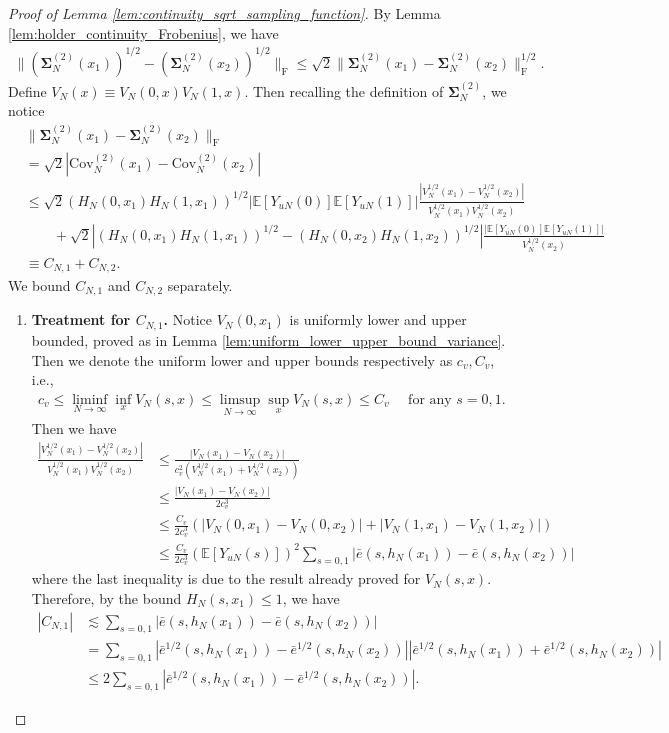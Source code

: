 \documentclass[12pt]{article}
\newcommand{\E}{\mathbb E}								%
\begin{document}
\begin{proof}[Proof of Lemma \ref{lem:continuity_sqrt_sampling_function}]
	By Lemma \ref{lem:holder_continuity_Frobenius}, we have 
	\begin{align*}
		\|(\bm \Sigma_N^{(2)}(x_1))^{1/2}-(\bm \Sigma_N^{(2)}(x_2))^{1/2}\|_{\mathrm{F}}\leq \sqrt{2}\|\bm \Sigma_N^{(2)}(x_1)-\bm \Sigma_N^{(2)}(x_2)\|_{\mathrm{F}}^{1/2}.
	\end{align*}
	Define $V_N(x)\equiv V_N(0,x)V_N(1,x)$. Then recalling the definition of $\bm \Sigma_N^{(2)}$, we notice
	\small 
	\begin{align*}
		&
		\|\bm \Sigma_N^{(2)}(x_1)-\bm \Sigma_N^{(2)}(x_2)\|_{\mathrm{F}}\\
		&
		=\sqrt{2}|\mathrm{Cov}_N^{(2)}(x_1)-\mathrm{Cov}_N^{(2)}(x_2)|\\
		&
		\leq \sqrt{2}(H_N(0,x_1)H_N(1,x_1))^{1/2}|\E[Y_{uN}(0)]\E[Y_{uN}(1)]|\frac{\left|V_N^{1/2}(x_1)-V_N^{1/2}(x_2)\right|}{V_N^{1/2}(x_1)V_N^{1/2}(x_2)}\\
		&
		\qquad + \sqrt{2}\left|(H_N(0,x_1)H_N(1,x_1))^{1/2}-(H_N(0,x_2)H_N(1,x_2))^{1/2}\right|\frac{|\E[Y_{uN}(0)]\E[Y_{uN}(1)]|}{V_N^{1/2}(x_2)}\\
		&
		\equiv C_{N,1}+C_{N,2}.
	\end{align*}
	\normalsize
	We bound $C_{N,1}$ and $C_{N,2}$ separately.
	\begin{enumerate}
		\item \textbf{Treatment for $C_{N,1}$.} Notice $V_N(0,x_1)$ is uniformly lower and upper bounded, proved as in Lemma \ref{lem:uniform_lower_upper_bound_variance}. Then we denote the uniform lower and upper bounds respectively as $c_v,C_v$, i.e.,
		\begin{align*}
			c_v\leq \liminf_{N\rightarrow\infty}\inf_{x}V_N(s,x)\leq \limsup_{N\rightarrow\infty}\sup_{x}V_N(s,x)\leq C_v\quad\text{ for any }s=0,1.
		\end{align*}
		Then we have
		\small
		\begin{align*}
			\frac{\left|V_N^{1/2}(x_1)-V_N^{1/2}(x_2)\right|}{V_N^{1/2}(x_1)V_N^{1/2}(x_2)}
			&
			\leq \frac{|V_N(x_1)-V_N(x_2)|}{c_v^2(V_N^{1/2}(x_1)+V_N^{1/2}(x_2))}\\
			&
			\leq \frac{|V_N(x_1)-V_N(x_2)|}{2c_v^3}\\
			&
			\leq \frac{C_v}{2c_v^3}(|V_N(0,x_1)-V_N(0,x_2)|+|V_N(1,x_1)-V_N(1,x_2)|)\\
			&
			\leq \frac{C_v}{2c_v^3}(\E[Y_{uN}(s)])^2\sum_{s=0,1}|\bar e(s,h_N(x_1))-\bar e(s,h_N(x_2))|
		\end{align*}
		\normalsize
		where the last inequality is due to the result already proved for $V_N(s,x)$. Therefore, by the bound $H_N(s,x_1)\leq 1$, we have 
		\begin{align*}
			|C_{N,1}|
			&
			\lesssim \sum_{s=0,1}|\bar e(s, h_N(x_1))-\bar e(s, h_N(x_2))|\\
			&
			=\sum_{s=0,1}|\bar e^{1/2}(s, h_N(x_1))-\bar e^{1/2}(s, h_N(x_2))||\bar e^{1/2}(s, h_N(x_1))+\bar e^{1/2}(s, h_N(x_2))|\\
			&
			\leq 2\sum_{s=0,1}|\bar e^{1/2}(s, h_N(x_1))-\bar e^{1/2}(s, h_N(x_2))|.
		\end{align*}
	

\end{enumerate}
\end{proof}
\end{document}
